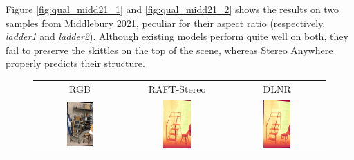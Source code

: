 \documentclass[10pt,twocolumn,letterpaper]{article}
\newcommand{\method}[0]{Stereo Anywhere\xspace}
\begin{document}
\clearpage

Figure \ref{fig:qual_midd21_1} and \ref{fig:qual_midd21_2} shows the results on two samples from Middlebury 2021, peculiar for their aspect ratio (respectively, \textit{ladder1} and \textit{ladder2}). Although existing models perform quite well on both, they fail to preserve the skittles on the top of the scene, whereas \method properly predicts their structure.

\begin{figure}[h]
    \centering
    \renewcommand{\tabcolsep}{1pt}
    \begin{tabular}{ccc}
        \small RGB &
        \small RAFT-Stereo \cite{lipson2021raft} &
        \small DLNR \cite{zhao2023high} \\
        \includegraphics[width=0.3\textwidth]{imgs/midd21/rgb/10.jpg} &
        \includegraphics[width=0.3\textwidth]{imgs/midd21/stereo/RAFT-Stereo/10.jpg} &
        \includegraphics[width=0.3\textwidth]{imgs/midd21/stereo/DLNR/10.jpg} \\

\end{tabular}
\end{figure}
\end{document}
